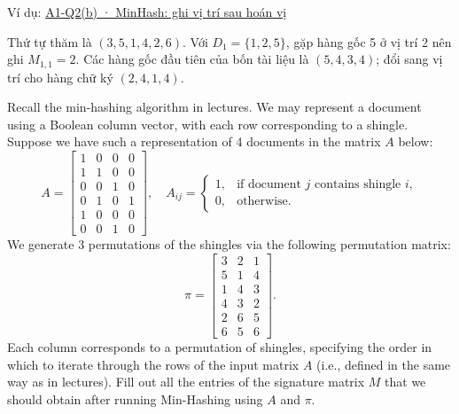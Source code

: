 \documentclass[10pt,a4paper,twocolumn]{article}
\newcommand{\blocklabel}[1]{\par\noindent#1\par\nobreak}
\newcommand{\qlink}[2]{\hyperref[question:#1]{#2}}
\newenvironment{example}[2]{%
  \par\addvspace{6pt}\noindent
  \raggedright
  \blocklabel{Ví dụ: \qlink{#1}{#2}}%
}{\par\addvspace{4pt}}
\begin{document}
\begin{example}{A1-Q2b}{A1-Q2(b) · MinHash: ghi vị trí sau hoán vị}
Thứ tự thăm là $(3,5,1,4,2,6)$. Với $D_1=\{1,2,5\}$, gặp hàng gốc 5 ở vị trí 2 nên ghi $M_{1,1}=2$. Các hàng gốc đầu tiên của bốn tài liệu là $(5,4,3,4)$; đổi sang vị trí cho hàng chữ ký $(2,4,1,4)$.
\end{example}

 Recall the min-hashing algorithm in lectures. We may represent a document using a Boolean column vector, with each row corresponding to a shingle. Suppose we have such a representation of 4 documents in the matrix $A$ below:
\[
A=\begin{bmatrix}1&0&0&0\\1&1&0&0\\0&0&1&0\\0&1&0&1\\1&0&0&0\\0&0&1&0\end{bmatrix},
\quad
A_{ij}=\begin{cases}1,&\text{if document }j\text{ contains shingle }i,\\0,&\text{otherwise.}\end{cases}
\]
We generate 3 permutations of the shingles via the following permutation matrix:
\[
\pi=\begin{bmatrix}3&2&1\\5&1&4\\1&4&3\\4&3&2\\2&6&5\\6&5&6\end{bmatrix}.
\]
Each column corresponds to a permutation of shingles, specifying the order in which to iterate through the rows of the input matrix $A$ (i.e., defined in the same way as in lectures). Fill out all the entries of the signature matrix $M$ that we should obtain after running Min-Hashing using $A$ and $\pi$.
\end{document}
